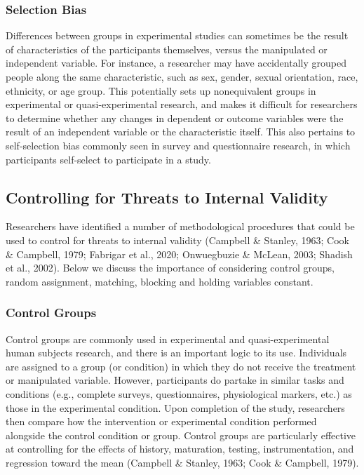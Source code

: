\documentclass[
  11pt,
]{book}
\begin{document}
\subsubsection{Selection Bias}\label{selection-bias}

Differences between groups in experimental studies can sometimes be the result of characteristics of the participants themselves, versus the manipulated or independent variable. For instance, a researcher may have accidentally grouped people along the same characteristic, such as sex, gender, sexual orientation, race, ethnicity, or age group. This potentially sets up nonequivalent groups in experimental or quasi-experimental research, and makes it difficult for researchers to determine whether any changes in dependent or outcome variables were the result of an independent variable or the characteristic itself. This also pertains to self-selection bias commonly seen in survey and questionnaire research, in which participants self-select to participate in a study.

\subsection{Controlling for Threats to Internal Validity}\label{controlling-for-threats-to-internal-validity}

Researchers have identified a number of methodological procedures that could be used to control for threats to internal validity (Campbell \& Stanley, 1963; Cook \& Campbell, 1979; Fabrigar et al., 2020; Onwuegbuzie \& McLean, 2003; Shadish et al., 2002). Below we discuss the importance of considering control groups, random assignment, matching, blocking and holding variables constant.

\subsubsection{Control Groups}\label{control-groups}

Control groups are commonly used in experimental and quasi-experimental human subjects research, and there is an important logic to its use. Individuals are assigned to a group (or condition) in which they do not receive the treatment or manipulated variable. However, participants do partake in similar tasks and conditions (e.g., complete surveys, questionnaires, physiological markers, etc.) as those in the experimental condition. Upon completion of the study, researchers then compare how the intervention or experimental condition performed alongside the control condition or group. Control groups are particularly effective at controlling for the effects of history, maturation, testing, instrumentation, and regression toward the mean (Campbell \& Stanley, 1963; Cook \& Campbell, 1979).
\end{document}
